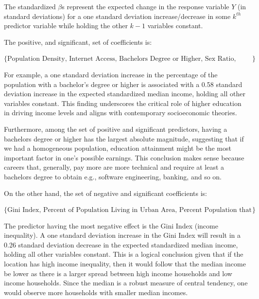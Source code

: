 \documentclass[
]{article}
\begin{document}
\newpage

The standardized \(\beta\)s represent the expected change in the
response variable \(Y\) (in standard deviations) for a one standard
deviation increase/decrease in some \(k^{th}\) predictor variable while
holding the other \(k-1\) variables constant.

The positive, and significant, set of coefficients is:

\(\{\text{Population Density, Internet Access, Bachelors Degree or Higher, Sex Ratio, Percent Hispanic or Latino}\}\)

For example, a one standard deviation increase in the percentage of the
population with a bachelor's degree or higher is associated with a 0.58
standard deviation increase in the expected standardized median income,
holding all other variables constant. This finding underscores the
critical role of higher education in driving income levels and aligns
with contemporary socioeconomic theories.

Furthermore, among the set of positive and significant predictors,
having a bachelors degree or higher has the largest absolute magnitude,
suggesting that if we had a homogeneous population, education attainment
might be the most important factor in one's possible earnings. This
conclusion makes sense because careers that, generally, pay more are
more technical and require at least a bachelors degree to obtain e.g.,
software engineering, banking, and so on.

On the other hand, the set of negative and significant coefficients is:

\(\{\text{Gini Index, Percent of Population Living in Urban Area, Percent Population that is Black}\}\)

The predictor having the most negative effect is the Gini Index (income
inequality). A one standard deviation increase in the Gini Index will
result in a 0.26 standard deviation decrease in the expected
standardized median income, holding all other variables constant. This
is a logical conclusion given that if the location has high income
inequality, then it would follow that the median income be lower as
there is a larger spread between high income households and low income
households. Since the median is a robust measure of central tendency,
one would observe more households with smaller median incomes.

\newpage
\end{document}

